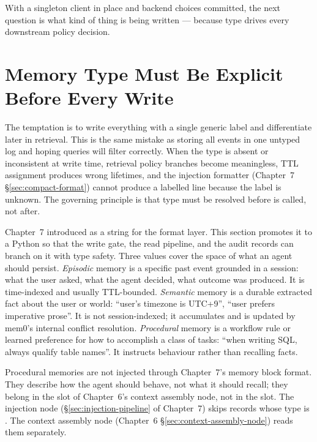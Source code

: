 With a singleton client in place and backend choices committed, the next
question is what kind of thing is being written --- because type drives every
downstream policy decision.

\section{Memory Type Must Be Explicit Before Every Write}
\label{sec:type-explicit}

The temptation is to write everything with a single generic label and
differentiate later in retrieval. This is the same mistake as storing all
events in one untyped log and hoping queries will filter correctly.
When the type is absent or inconsistent at write time, retrieval policy
branches become meaningless, TTL assignment produces wrong lifetimes, and
the injection formatter (Chapter~7 \S\ref{sec:compact-format}) cannot
produce a labelled line because the label is unknown. The governing principle
is that type must be resolved before  is called, not after.

Chapter~7 introduced  as a  string for the
format layer. This section promotes it to a Python  so that the
write gate, the read pipeline, and the audit records can branch on it with
type safety. Three values cover the space of what an agent should persist.
\emph{Episodic} memory is a specific past event grounded in a session: what
the user asked, what the agent decided, what outcome was produced. It is
time-indexed and usually TTL-bounded. \emph{Semantic} memory is a durable
extracted fact about the user or world: ``user's timezone is UTC+9'',
``user prefers imperative prose''. It is not session-indexed; it accumulates
and is updated by mem0's internal conflict resolution. \emph{Procedural}
memory is a workflow rule or learned preference for how to accomplish a
class of tasks: ``when writing SQL, always qualify table names''. It
instructs behaviour rather than recalling facts.

\begin{notebox}
Procedural memories are not injected through Chapter~7's memory block format.
They describe how the agent should behave, not what it should recall; they
belong in the  slot of Chapter~6's context assembly node, not in
the  slot. The injection node
(\S\ref{sec:injection-pipeline} of Chapter~7) skips records whose type
is . The context assembly node (Chapter~6
\S\ref{sec:context-assembly-node}) reads them separately.
\end{notebox}

